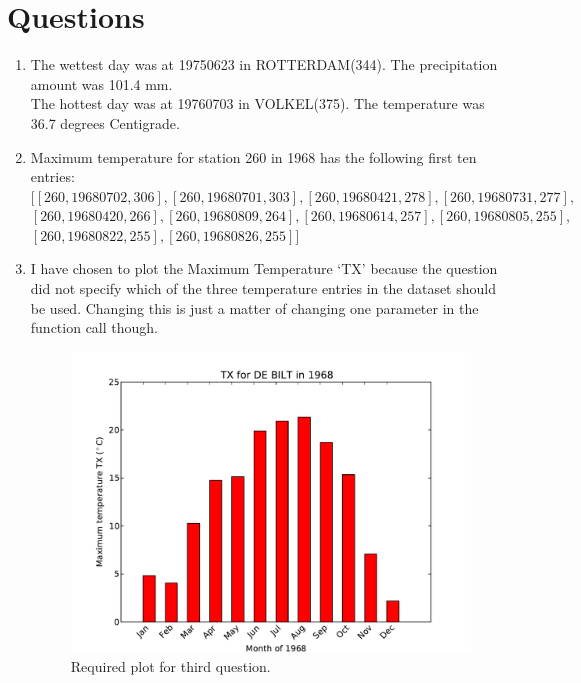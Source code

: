 \documentclass[a4paper]{article}
\begin{document}
\section{Questions}
\begin{enumerate}
\item
The wettest day was at 19750623 in ROTTERDAM(344). The precipitation amount was 101.4 mm. \\
The hottest day was at 19760703 in VOLKEL(375). The temperature was 36.7 degrees Centigrade. \\
\item
Maximum temperature for station 260 in 1968 has the following first ten entries: \\
$[[260, 19680702, 306], [260, 19680701, 303], [260, 19680421, 278], [260, 19680731, 277], $\\
$[260, 19680420, 266], [260, 19680809, 264], [260, 19680614, 257], [260, 19680805, 255], $\\
$[260, 19680822, 255], [260, 19680826, 255]]$ 
\item
I have chosen to plot the Maximum Temperature `TX' because the question did not specify which of the three temperature entries in the dataset should be used. Changing this is just a matter of changing one parameter in the function call though.
\begin{figure}[h!] 
\begin{center} 
\includegraphics[scale=0.5]{../Week3/BLAC_hw5_TLRH_6126561_260_TX_1968.pdf} 
\caption{Required plot for third question.}
\end{center} 
\end{figure} 
\end{enumerate}
%
\end{document}
